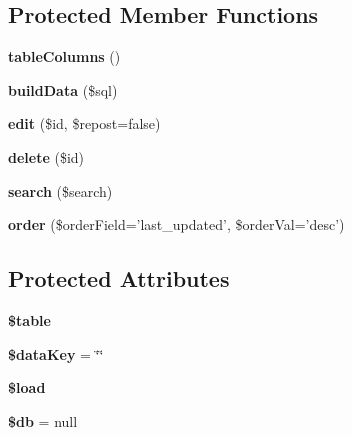 \subsection*{Protected Member Functions}
\begin{DoxyCompactItemize}
\item 
\hypertarget{class_table_controller_a70e5cc5fdb2be40dd13850769aedaa5f}{
{\bfseries tableColumns} ()}
\label{class_table_controller_a70e5cc5fdb2be40dd13850769aedaa5f}

\item 
\hypertarget{class_table_controller_ae80210635040a4898e7622e78be42b37}{
{\bfseries buildData} (\$sql)}
\label{class_table_controller_ae80210635040a4898e7622e78be42b37}

\item 
\hypertarget{class_table_controller_a3e2ca5065723bc35286c37f76b86fac2}{
{\bfseries edit} (\$id, \$repost=false)}
\label{class_table_controller_a3e2ca5065723bc35286c37f76b86fac2}

\item 
\hypertarget{class_table_controller_a2f8258add505482d7f00ea26493a5723}{
{\bfseries delete} (\$id)}
\label{class_table_controller_a2f8258add505482d7f00ea26493a5723}

\item 
\hypertarget{class_table_controller_a0d624b549023221829714196e71f38da}{
{\bfseries search} (\$search)}
\label{class_table_controller_a0d624b549023221829714196e71f38da}

\item 
\hypertarget{class_table_controller_aaa6b1813bb87dfa5e9d2cb37ecf4fdf0}{
{\bfseries order} (\$orderField='last\_\-updated', \$orderVal='desc')}
\label{class_table_controller_aaa6b1813bb87dfa5e9d2cb37ecf4fdf0}

\end{DoxyCompactItemize}
\subsection*{Protected Attributes}
\begin{DoxyCompactItemize}
\item 
\hypertarget{class_table_controller_ae8876a14058f368335baccf35af4a22b}{
{\bfseries \$table}}
\label{class_table_controller_ae8876a14058f368335baccf35af4a22b}

\item 
\hypertarget{class_table_controller_a12406857a20a38d32716012edda34fb1}{
{\bfseries \$dataKey} = \char`\"{}\char`\"{}}
\label{class_table_controller_a12406857a20a38d32716012edda34fb1}

\item 
\hypertarget{class_controller_a98494fb905b8ee62599dad677dd67fe0}{
{\bfseries \$load}}
\label{class_controller_a98494fb905b8ee62599dad677dd67fe0}

\item 
\hypertarget{class_object_a1fa3127fc82f96b1436d871ef02be319}{
{\bfseries \$db} = null}
\label{class_object_a1fa3127fc82f96b1436d871ef02be319}

\end{DoxyCompactItemize}


